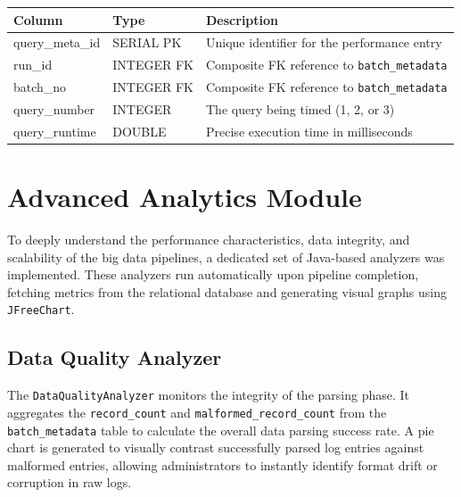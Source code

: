 \documentclass[11pt,a4paper]{article}
\begin{document}
\begin{schematable}
\begin{tabularx}{\linewidth}{@{} >{\ttfamily\small}l >{\small}l X @{}}
\toprule
\textnormal{\textbf{Column}} & \textbf{Type} & \textbf{Description} \\
\midrule
query\_meta\_id      & SERIAL PK  & Unique identifier for the performance entry \\
run\_id              & INTEGER FK & Composite FK reference to \texttt{batch\_metadata} \\
batch\_no            & INTEGER FK & Composite FK reference to \texttt{batch\_metadata} \\
query\_number        & INTEGER    & The query being timed (1, 2, or 3) \\
query\_runtime       & DOUBLE     & Precise execution time in milliseconds \\
\bottomrule
\end{tabularx}
\end{schematable}

\section{Advanced Analytics Module}

To deeply understand the performance characteristics, data integrity, and scalability of the big data pipelines, a dedicated set of Java-based analyzers was implemented. These analyzers run automatically upon pipeline completion, fetching metrics from the relational database and generating visual graphs using \texttt{JFreeChart}.

\subsection{Data Quality Analyzer}
The \texttt{DataQualityAnalyzer} monitors the integrity of the parsing phase. It aggregates the \texttt{record\_count} and \texttt{malformed\_record\_count} from the \texttt{batch\_metadata} table to calculate the overall data parsing success rate. A pie chart is generated to visually contrast successfully parsed log entries against malformed entries, allowing administrators to instantly identify format drift or corruption in raw logs.

\vspace{5cm} %
\end{document}
